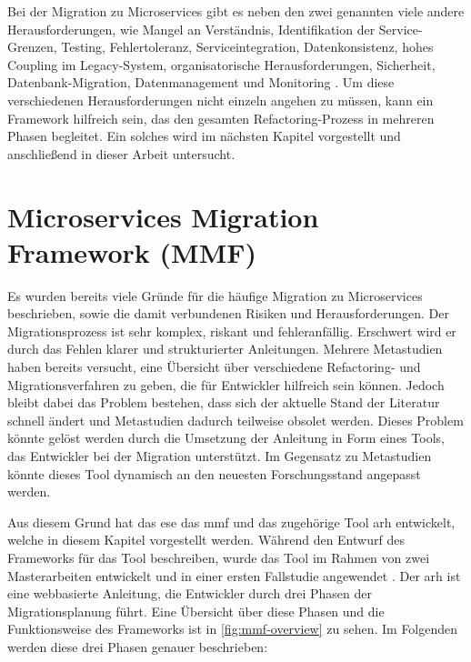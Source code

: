 Bei der Migration zu Microservices gibt es neben den zwei genannten viele andere Her\-aus\-for\-de\-run\-gen, wie Mangel an Verständnis, Identifikation der Service-Grenzen, Testing, Fehlertoleranz, Serviceintegration, Datenkonsistenz, hohes Coupling im Legacy-System, organisatorische Her\-aus\-for\-de\-run\-gen, Sicherheit, Datenbank-Migration, Datenmanagement und Monitoring \cite{migration-challanges2023}.
Um diese verschiedenen Her\-aus\-for\-de\-run\-gen nicht einzeln angehen zu müssen, kann ein Framework hilfreich sein, das den gesamten Refactoring-Prozess in mehreren Phasen begleitet.
Ein solches wird im nächsten Kapitel vorgestellt und anschließend in dieser Arbeit untersucht.

\section{Microservices Migration Framework (MMF)}
\label{sec:mmf}

Es wurden bereits viele Gründe für die häufige Migration zu Microservices beschrieben, sowie die damit verbundenen Risiken und Herausforderungen.
Der Migrationsprozess ist sehr komplex, riskant und fehleranfällig.
Erschwert wird er durch das Fehlen klarer und strukturierter Anleitungen.
Mehrere Metastudien haben bereits versucht, eine Übersicht über verschiedene Refactoring- und Migrationsverfahren zu geben, die für Entwickler hilfreich sein können.
Jedoch bleibt dabei das Problem bestehen, dass sich der aktuelle Stand der Literatur schnell ändert und Metastudien dadurch teilweise obsolet werden.
Dieses Problem könnte gelöst werden durch die Umsetzung der Anleitung in Form eines Tools, das Entwickler bei der Migration unterstützt.
Im Gegensatz zu Metastudien könnte dieses Tool dynamisch an den neuesten Forschungsstand angepasst werden.

Aus diesem Grund hat das \gls{ese} das \acrfull{mmf} und das zugehörige Tool \gls{arh} \cite{arh-github} entwickelt, welche in diesem Kapitel vorgestellt werden.
Während  den Entwurf des Frameworks für das Tool beschreiben, wurde das Tool im Rahmen von zwei Masterarbeiten entwickelt \cite{master-daniel-koch,master-tobias-haller} und in einer ersten Fallstudie angewendet \cite{master-marvin-knodel}.
Der \gls{arh} ist eine webbasierte Anleitung, die Entwickler durch drei Phasen der Migrationsplanung führt.
Eine Übersicht über diese Phasen und die Funktionsweise des Frameworks ist in \cref{fig:mmf-overview} zu sehen.
Im Folgenden werden diese drei Phasen genauer beschrieben:

